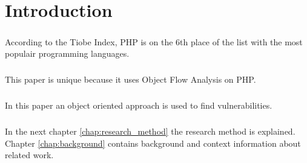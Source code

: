 \documentclass[../main.tex]{subfiles}
\begin{document}
    \chapter{Introduction}\label{chap:introduction}

    \paragraph{} %
        According to the Tiobe Index\cite{Tiobe:2014}, PHP is on the 6th place of the list with the most populair programming languages.
        
    \paragraph{} %
        This paper is unique because it uses Object Flow Analysis on PHP.
        
       
    \paragraph{} %
        In this paper an object oriented approach is used to find vulnerabilities.
       
    \paragraph{} %
        In the next chapter \ref{chap:research_method} the research method is explained.
        Chapter \ref{chap:background} contains background and context information about related work.
      
\end{document}
